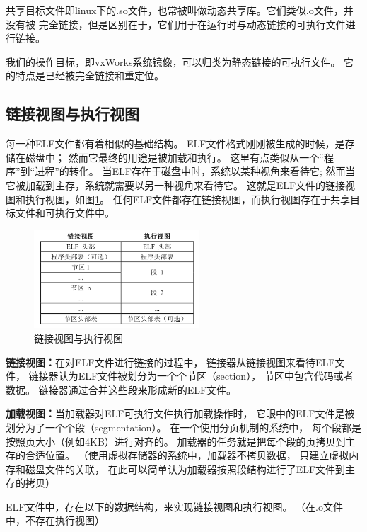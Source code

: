 共享目标文件即linux下的.so文件，也常被叫做动态共享库。它们类似.o文件，并没有被
完全链接，但是区别在于，它们用于在运行时与动态链接的可执行文件进行链接。

我们的操作目标，即vxWorks系统镜像，可以归类为静态链接的可执行文件。
它的特点是已经被完全链接和重定位。

\subsection{链接视图与执行视图}

每一种ELF文件都有着相似的基础结构。
ELF文件格式刚刚被生成的时候，是存储在磁盘中；
然而它最终的用途是被加载和执行。
这里有点类似从一个“程序”到“进程”的转化。
当ELF存在于磁盘中时，系统以某种视角来看待它;
然而当它被加载到主存，系统就需要以另一种视角来看待它。
这就是ELF文件的链接视图和执行视图，如图\ref{elf-map}。
任何ELF文件都存在链接视图，而执行视图存在于共享目标文件和可执行文件中。

\begin{figure}[h!]
  \centering
  \includegraphics[width=0.55\textwidth]{figure/elf-map.png}
  \caption{链接视图与执行视图}
  \label{elf-map}
\end{figure}

\textbf{链接视图：}在对ELF文件进行链接的过程中，
链接器从链接视图来看待ELF文件，
链接器认为ELF文件被划分为一个个节区（section），
节区中包含代码或者数据。
链接器通过合并这些段来形成新的ELF文件。

\textbf{加载视图：}当加载器对ELF可执行文件执行加载操作时，
它眼中的ELF文件是被划分为了一个个段（segmentation）。
在一个使用分页机制的系统中，
每个段都是按照页大小（例如4KB）进行对齐的。
加载器的任务就是把每个段的页拷贝到主存的合适位置。
（使用虚拟存储器的系统中，加载器不拷贝数据，
只建立虚拟内存和磁盘文件的关联，
在此可以简单认为加载器按照段结构进行了ELF文件到主存的拷贝）

ELF文件中，存在以下的数据结构，来实现链接视图和执行视图。
（在.o文件中，不存在执行视图）



